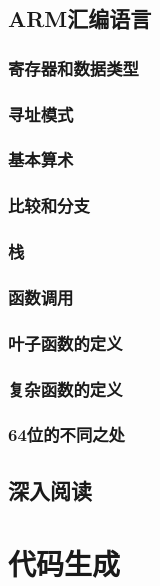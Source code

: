\documentclass[cn,11pt,chinese]{elegantbook}
\begin{document}
\section{ARM汇编语言}

\subsection{寄存器和数据类型}

\subsection{寻址模式}

\subsection{基本算术}

\subsection{比较和分支}

\subsection{栈}

\subsection{函数调用}

\subsection{叶子函数的定义}

\subsection{复杂函数的定义}

\subsection{64位的不同之处}

\section{深入阅读}

\chapter{代码生成}
\end{document}
